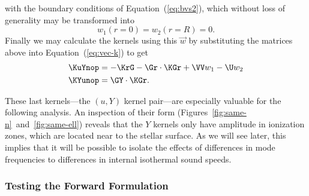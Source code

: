 \begin{description}
with the boundary conditions of Equation~(\ref{eq:bvs2}), which without loss of generality may be transformed into
\begin{equation} \label{eq:bvs}
    w_1(r = 0) = w_2(r=R) = 0.
\end{equation}
Finally we may calculate the kernels using this $\vec w$ by substituting the matrices above into Equation~(\ref{eq:vec-k}) to get
\begin{align}
    \KuYnop &= -\KrG - \Gr \cdot \KGr + \VV w_1 - \U w_2 \\
    \KYunop &= \GY \cdot \KGr.
\end{align}
\end{description}
These last kernels---the ${(u,Y)}$ kernel pair---are especially valuable for the following analysis. 
An inspection of their form (Figures~\ref{fig:same-n}~and~\ref{fig:same-ell}) reveals that the $Y$ kernels only have amplitude in ionization zones, which are located near to the stellar surface. 
As we will see later, this implies that it will be possible to isolate the effects of differences in mode frequencies to differences in internal isothermal sound speeds. 

\subsubsection*{Testing the Forward Formulation}

